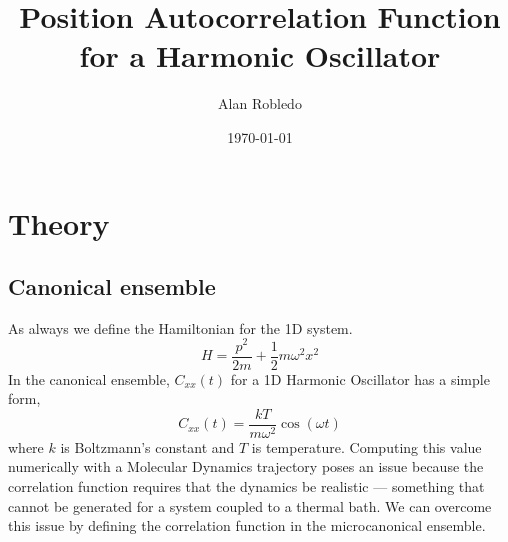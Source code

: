 \documentclass{article}
\title{Position Autocorrelation Function for a Harmonic Oscillator}
\date{\today}
\author{Alan Robledo}
\newcommand{\be}{\begin{equation}}
\newcommand{\ee}{\end{equation}}
\begin{document}
\maketitle
\section{Theory}
\subsection{Canonical ensemble}
As always we define the Hamiltonian for the 1D system.
\be
  H = \frac{p^2}{2m} + \frac{1}{2} m \omega^2 x^2
\ee
In the canonical ensemble, $C_{xx}(t)$ for a 1D Harmonic Oscillator has a simple form,
\be
  C_{xx}(t) = \frac{kT}{m \omega^2} \cos(\omega t)
\ee
where $k$ is Boltzmann's constant and $T$ is temperature. Computing this value numerically with a Molecular Dynamics trajectory poses an issue because the correlation function requires that the dynamics be realistic --- something that cannot be generated for a system coupled to a thermal bath. We can overcome this issue by defining the correlation function in the microcanonical ensemble.
\end{document}

